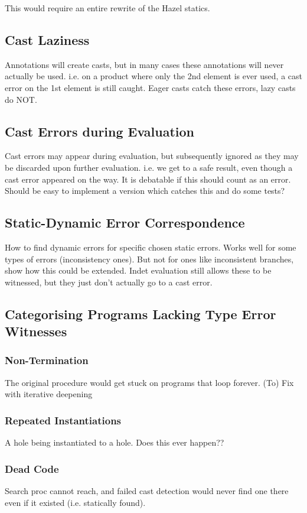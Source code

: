 This would require an entire rewrite of the Hazel statics.
\subsection{Cast Laziness}
Annotations will create casts, but in many cases these annotations will never actually be used. i.e. on a product where only the 2nd element is ever used, a cast error on the 1st element is still caught. Eager casts catch these errors, lazy casts do NOT.

\subsection{Cast Errors during Evaluation}
Cast errors may appear during evaluation, but subsequently ignored as they may be discarded upon further evaluation. i.e. we get to a safe result, even though a cast error appeared on the way. It is debatable if this should count as an error. Should be easy to implement a version which catches this and do some tests?
  
\subsection{Static-Dynamic Error Correspondence}
How to find dynamic errors for specific chosen static errors. Works well for some types of errors (inconsistency ones). But not for ones like inconsistent branches, show how this could be extended. Indet evaluation still allows these to be witnessed, but they just don't actually go to a cast error.
  
\subsection{Categorising Programs Lacking Type Error Witnesses}
\subsubsection{Non-Termination}
The original procedure would get stuck on programs that loop forever. (To) Fix with iterative deepening
\subsubsection{Repeated Instantiations}
A hole being instantiated to a hole. Does this ever happen??
\subsubsection{Dead Code}
Search proc cannot reach, and failed cast detection would never find one there even if it existed (i.e. statically found).
